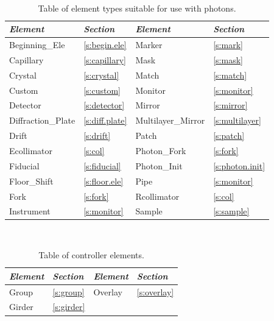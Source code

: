 \begin{table}[ht]
\centering
{\tt
\begin{tabular}{llll} \toprule
  {\it Element}      & {\it Section}         & {\it Element}       & {\it Section}      \\ \midrule
  Beginning_Ele      & \ref{s:begin.ele}     &  Marker             & \ref{s:mark}       \\
  Capillary          & \ref{s:capillary}     &  Mask               & \ref{s:mask}       \\
  Crystal            & \ref{s:crystal}       &  Match              & \ref{s:match}      \\
  Custom             & \ref{s:custom}        &  Monitor            & \ref{s:monitor}    \\ 
  Detector           & \ref{s:detector}      &  Mirror             & \ref{s:mirror}     \\
  Diffraction_Plate  & \ref{s:diff.plate}    &  Multilayer_Mirror  & \ref{s:multilayer} \\
  Drift              & \ref{s:drift}         &  Patch              & \ref{s:patch}      \\
  Ecollimator        & \ref{s:col}           &  Photon_Fork        & \ref{s:fork}       \\
  Fiducial           & \ref{s:fiducial}      &  Photon_Init        & \ref{s:photon.init}\\
  Floor_Shift        & \ref{s:floor.ele}     &  Pipe               & \ref{s:monitor}    \\
  Fork               & \ref{s:fork}          &  Rcollimator        & \ref{s:col}        \\
  Instrument         & \ref{s:monitor}       &  Sample             & \ref{s:sample}     \\ \bottomrule
\end{tabular}
}
\caption{Table of element types suitable for use with photons.}
\label{t:photon.classes}\center
\end{table}

\begin{table}[ht]
\centering
{\tt
\begin{tabular}{llll} \toprule
  {\it Element}  & {\it Section}     & {\it Element}  & {\it Section}    \\ \midrule
  Group          & \ref{s:group}     &  Overlay       & \ref{s:overlay}  \\
  Girder         & \ref{s:girder}    &                &                  \\ \bottomrule
\end{tabular}
}
\caption{Table of controller elements.}
\label{t:control.classes}\center
\end{table}

